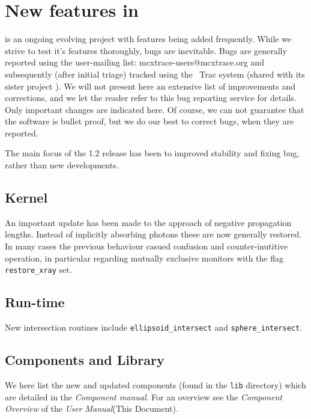 
\chapter{New features in \MCX \version}
\label{c:changes}

\MCX is an ongoing evolving project with features being added frequently. While we strive to test it's features thoroughly, bugs
are inevitable. Bugs are generally reported using the user-mailing list: mcxtrace-users@mcxtrace.org and subsequently (after initial triage)
tracked using the \MCX\ Trac system \cite{mccode_trac_webpage}
(shared with its sister project \MCS). We will not present here an extensive
list of improvements and corrections, and we let the reader refer to this bug reporting service
for details. Only important changes are indicated here.
Of course, we can not guarantee that the software is bullet proof, but we do our best to correct bugs, when they are reported.

The main focus of the 1.2 release has been to improved stability and fixing bug, rather than new developments.


\section{Kernel}
\label{s:new-features:kernel}
An important update has been made to the approach of negative propagation lengths. Instead of inplicitly absorbing photons these are now generally restored.
In many cases the previous behaviour casued confusion and counter-inutitive operation, in particular regarding mutually exclusive monitors with the flag 
\texttt{restore\_xray} set.

\section{Run-time}
\label{s:new-features:run-time}
New intersection routines include \verb+ellipsoid_intersect+ and \verb+sphere_intersect+.

\section{Components and Library}
\label{s:new-features:components}
 
We here list the new and updated components (found in the \MCX \verb+lib+ directory)
which are detailed in the \textit{Component manual}. For an overview see the \textit{Component Overview} of the \textit{User Manual}(This Document).
